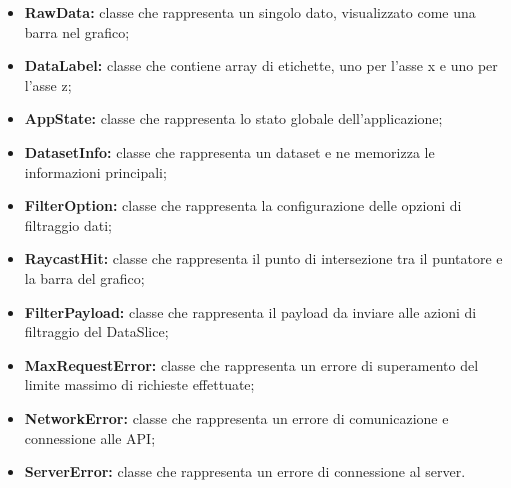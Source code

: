     \begin{itemize}
        \item \textbf{RawData:} classe che rappresenta un singolo dato, visualizzato come una barra nel grafico;
        \item \textbf{DataLabel:} classe che contiene array di etichette, uno per l'asse x e uno per l'asse z;
        \item \textbf{AppState:} classe che rappresenta lo stato globale dell'applicazione;
        \item \textbf{DatasetInfo:} classe che rappresenta un dataset e ne memorizza le informazioni principali;
        \item \textbf{FilterOption:} classe che rappresenta la configurazione delle opzioni di filtraggio dati;
        \item \textbf{RaycastHit:} classe che rappresenta il punto di intersezione tra il puntatore e la barra del grafico;
        \item \textbf{FilterPayload:} classe che rappresenta il payload da inviare alle azioni di filtraggio del DataSlice;
        \item \textbf{MaxRequestError:} classe che rappresenta un errore di superamento del limite massimo di richieste effettuate;
        \item \textbf{NetworkError:} classe che rappresenta un errore di comunicazione e connessione alle API;
        \item \textbf{ServerError:} classe che rappresenta un errore di connessione al server.
    \end{itemize}
